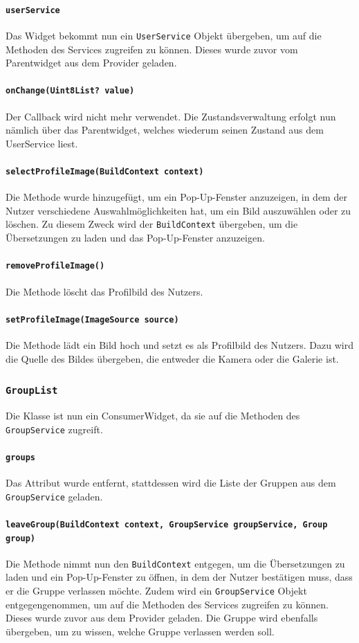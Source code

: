 \documentclass{implementierungsheft}
\begin{document}
\paragraph{\texttt{userService}}
Das Widget bekommt nun ein \texttt{UserService} Objekt übergeben, um auf die Methoden des Services zugreifen zu können. Dieses wurde zuvor vom Parentwidget aus dem Provider geladen.
\paragraph{\texttt{onChange(Uint8List? value)}}
Der Callback wird nicht mehr verwendet. Die Zustandsverwaltung erfolgt nun nämlich über das Parentwidget, welches wiederum seinen Zustand aus dem UserService liest.
\paragraph{\texttt{selectProfileImage(BuildContext context)}}
Die Methode wurde hinzugefügt, um ein Pop-Up-Fenster anzuzeigen, in dem der Nutzer verschiedene Auswahlmöglichkeiten hat, um ein Bild auszuwählen oder zu löschen. Zu diesem Zweck wird der \texttt{BuildContext} übergeben, um die Übersetzungen zu laden und das Pop-Up-Fenster anzuzeigen.
\paragraph*{\texttt{removeProfileImage()}}
Die Methode löscht das Profilbild des Nutzers.
\paragraph*{\texttt{setProfileImage(ImageSource source)}}
Die Methode lädt ein Bild hoch und setzt es als Profilbild des Nutzers. Dazu wird die Quelle des Bildes übergeben, die entweder die Kamera oder die Galerie ist.
\subsubsection*{\texttt{GroupList}}
Die Klasse ist nun ein ConsumerWidget, da sie auf die Methoden des \texttt{GroupService} zugreift.
\paragraph{\texttt{groups}}
Das Attribut wurde entfernt, stattdessen wird die Liste der Gruppen aus dem \texttt{GroupSer\-vice} geladen.
\paragraph{\texttt{leaveGroup(BuildContext context, GroupService groupService, Group group)}}
Die Methode nimmt nun den \texttt{BuildContext} entgegen, um die Übersetzungen zu laden und ein Pop-Up-Fenster zu öffnen, in dem der Nutzer bestätigen muss, dass er die Gruppe verlassen möchte. Zudem wird ein \texttt{GroupService} Objekt entgegengenommen, um auf die Methoden des Services zugreifen zu können. Dieses wurde zuvor aus dem Provider geladen. Die Gruppe wird ebenfalls übergeben, um zu wissen, welche Gruppe verlassen werden soll.
\end{document}

